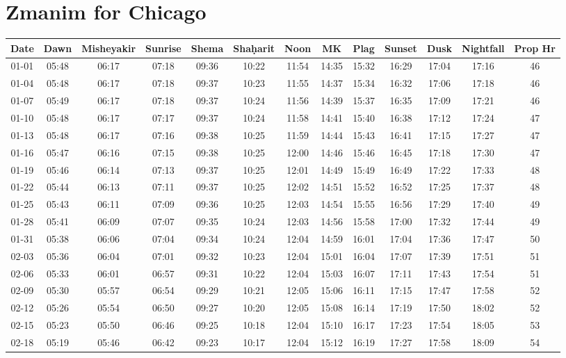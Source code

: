 \section{Zmanim for Chicago }

\begin{footnotesize}
	\begin{longtable}{c | c | c | c | c | c | c | c | c | c | c | c | c}
		Date&Dawn&Misheyakir&Sunrise&Shema&Sha\d{h}arit&Noon&MK&Plag&Sunset&Dusk&Nightfall&Prop Hr\\\hline\endhead
		01-01&05:48&06:17&07:18&09:36&10:22&11:54&14:35&15:32&16:29&17:04&17:16&46\\\hline
		01-04&05:48&06:17&07:18&09:37&10:23&11:55&14:37&15:34&16:32&17:06&17:18&46\\\hline
		01-07&05:49&06:17&07:18&09:37&10:24&11:56&14:39&15:37&16:35&17:09&17:21&46\\\hline
		01-10&05:48&06:17&07:17&09:37&10:24&11:58&14:41&15:40&16:38&17:12&17:24&47\\\hline
		01-13&05:48&06:17&07:16&09:38&10:25&11:59&14:44&15:43&16:41&17:15&17:27&47\\\hline
		01-16&05:47&06:16&07:15&09:38&10:25&12:00&14:46&15:46&16:45&17:18&17:30&47\\\hline
		01-19&05:46&06:14&07:13&09:37&10:25&12:01&14:49&15:49&16:49&17:22&17:33&48\\\hline
		01-22&05:44&06:13&07:11&09:37&10:25&12:02&14:51&15:52&16:52&17:25&17:37&48\\\hline
		01-25&05:43&06:11&07:09&09:36&10:25&12:03&14:54&15:55&16:56&17:29&17:40&49\\\hline
		01-28&05:41&06:09&07:07&09:35&10:24&12:03&14:56&15:58&17:00&17:32&17:44&49\\\hline
		01-31&05:38&06:06&07:04&09:34&10:24&12:04&14:59&16:01&17:04&17:36&17:47&50\\\hline
		02-03&05:36&06:04&07:01&09:32&10:23&12:04&15:01&16:04&17:07&17:39&17:51&51\\\hline
		02-06&05:33&06:01&06:57&09:31&10:22&12:04&15:03&16:07&17:11&17:43&17:54&51\\\hline
		02-09&05:30&05:57&06:54&09:29&10:21&12:05&15:06&16:11&17:15&17:47&17:58&52\\\hline
		02-12&05:26&05:54&06:50&09:27&10:20&12:05&15:08&16:14&17:19&17:50&18:02&52\\\hline
		02-15&05:23&05:50&06:46&09:25&10:18&12:04&15:10&16:17&17:23&17:54&18:05&53\\\hline
		02-18&05:19&05:46&06:42&09:23&10:17&12:04&15:12&16:19&17:27&17:58&18:09&54\\\hline

\end{longtable}
\end{footnotesize}
